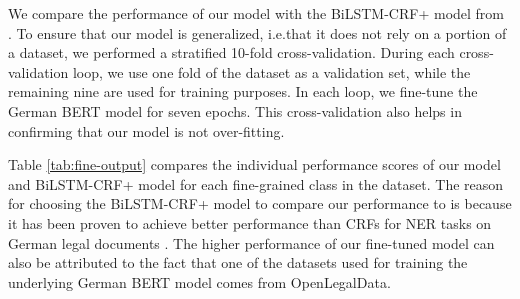 \documentclass[a4paper,twoside]{article}
\begin{document}
We compare the performance of our model with the BiLSTM-CRF+ model from \cite{leitner2019fine}.  To ensure that our model is generalized, i.e.that it does not rely on a portion of a dataset, we performed a stratified 10-fold cross-validation. During each cross-validation loop, we use one fold of the dataset as a validation set, while the remaining nine are used for training purposes. In each loop, we fine-tune the German BERT model for seven epochs. This cross-validation also helps in confirming that our model is not over-fitting. %

Table \ref{tab:fine-output} compares the individual performance scores of our model and BiLSTM-CRF+ model for each fine-grained class in the dataset. The reason for choosing the BiLSTM-CRF+ model to compare our performance to is because it has been proven to achieve better performance than CRFs for NER tasks on German legal documents \cite{leitner2019fine}. The higher performance of our fine-tuned model can also be attributed to the fact that one of the datasets used for training the underlying German BERT model comes from OpenLegalData.
\end{document}
